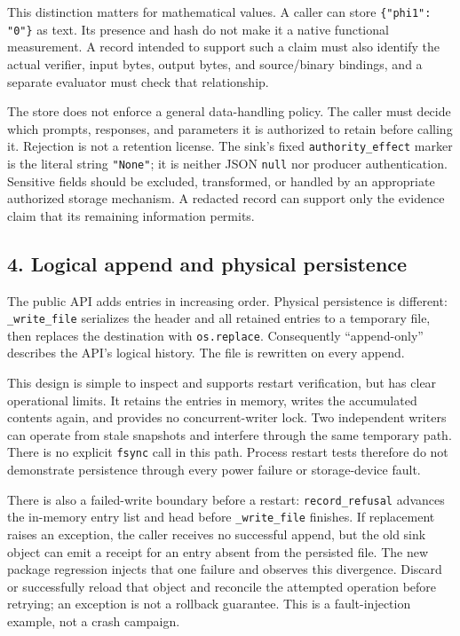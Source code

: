 \documentclass[
  11pt,
]{article}
\newcommand{\passthrough}[1]{#1}
\begin{document}
This distinction matters for mathematical values. A caller can store
\texttt{\{"phi1": "0"\}} as text. Its presence and hash
do not make it a native functional measurement. A record intended to
support such a claim must also identify the actual verifier, input
bytes, output bytes, and source/binary bindings, and a separate
evaluator must check that relationship.

The store does not enforce a general data-handling policy. The caller
must decide which prompts, responses, and parameters it is authorized to
retain before calling it. Rejection is not a retention license. The
sink's fixed \texttt{\nolinkurl{authority_effect}} marker is the
literal string \passthrough{\lstinline!"None"!}; it is neither JSON
\passthrough{\lstinline!null!} nor producer authentication. Sensitive
fields should be excluded, transformed, or handled by an appropriate
authorized storage mechanism. A redacted record can support only the
evidence claim that its remaining information permits.

\hypertarget{logical-append-and-physical-persistence}{%
\subsection{4. Logical append and physical
persistence}\label{logical-append-and-physical-persistence}}

The public API adds entries in increasing order. Physical persistence is
different: \texttt{\nolinkurl{_write_file}} serializes the header
and all retained entries to a temporary file, then replaces the
destination with \passthrough{\lstinline!os.replace!}. Consequently
``append-only'' describes the API's logical history. The file is
rewritten on every append.

This design is simple to inspect and supports restart verification, but
has clear operational limits. It retains the entries in memory, writes
the accumulated contents again, and provides no concurrent-writer lock.
Two independent writers can operate from stale snapshots and interfere
through the same temporary path. There is no explicit
\passthrough{\lstinline!fsync!} call in this path. Process restart tests
therefore do not demonstrate persistence through every power failure or
storage-device fault.

There is also a failed-write boundary before a restart:
\texttt{\nolinkurl{record_refusal}} advances the in-memory entry
list and head before \texttt{\nolinkurl{_write_file}} finishes.
If replacement raises an exception, the caller receives no successful
append, but the old sink object can emit a receipt for an entry absent
from the persisted file. The new package regression injects that one
failure and observes this divergence. Discard or successfully reload
that object and reconcile the attempted operation before retrying; an
exception is not a rollback guarantee. This is a fault-injection
example, not a crash campaign.
\end{document}
